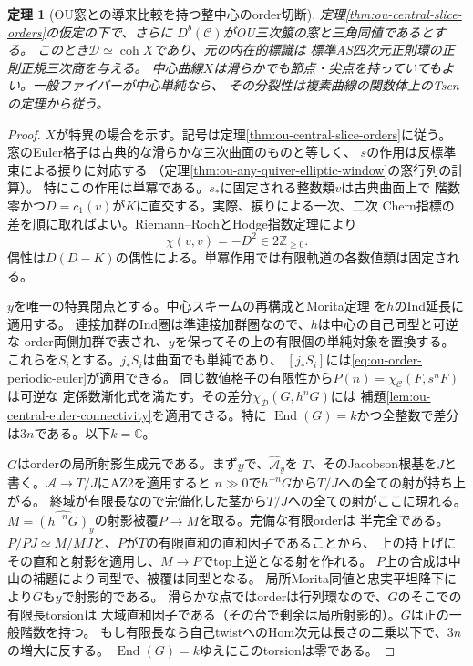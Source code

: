 \documentclass[11pt,a4paper]{ltjsarticle}
\newtheorem{theorem}{定理}[section]
\theoremstyle{definition}
\newcommand{\coh}{\operatorname{coh}}
\begin{document}
\begin{theorem}[OU窓との導来比較を持つ整中心のorder切断]
\label{thm:ou-derived-order-slice}
定理\ref{thm:ou-central-slice-orders}の仮定の下で、さらに
$D^b(\mathcal C)$がOU三次箙の窓と三角同値であるとする。
このとき$\mathcal D\simeq\coh X$であり、元の内在的標識は
標準AS四次元正則環の正則正規三次商を与える。
中心曲線$X$は滑らかでも節点・尖点を持っていてもよい。一般ファイバーが中心単純なら、
その分裂性は複素曲線の関数体上のTsenの定理から従う。
\end{theorem}
\begin{proof}
$X$が特異の場合を示す。記号は定理\ref{thm:ou-central-slice-orders}に従う。
窓のEuler格子は古典的な滑らかな三次曲面のものと等しく、
$s$の作用は反標準束による捩りに対応する
（定理\ref{thm:ou-any-quiver-elliptic-window}の窓行列の計算）。
特にこの作用は単冪である。$s_*$に固定される整数類$v$は古典曲面上で
階数零かつ$D=c_1(v)$が$K$に直交する。実際、捩りによる一次、二次
Chern指標の差を順に取ればよい。Riemann--RochとHodge指数定理により
\[
 \chi(v,v)=-D^2\in 2\mathbb Z_{\ge0}.
 \tag{*}\label{eq:ou-order-periodic-euler}
\]
偶性は$D(D-K)$の偶性による。単冪作用では有限軌道の各数値類は固定される。

$y$を唯一の特異閉点とする。中心スキームの再構成とMorita定理
\cite[Theorems~4.4,~4.6]{BurbanDrozdMorita}を$h$のInd延長に適用する。
連接加群のInd圏は準連接加群圏なので、$h$は中心の自己同型と可逆な
order両側加群で表され、$y$を保ってその上の有限個の単純対象を置換する。
これらを$S_i$とする。$j_*S_i$は曲面でも単純であり、
$[j_*S_i]$には\eqref{eq:ou-order-periodic-euler}が適用できる。
同じ数値格子の有限性から$P(n)=\chi_{\mathcal C}(F,s^nF)$は可逆な
定係数漸化式を満たす。その差分$\chi_{\mathcal D}(G,h^nG)$には
補題\ref{lem:ou-central-euler-connectivity}を適用できる。特に
$\operatorname{End}(G)=k$かつ全整数で差分は$3n$である。以下$k=\mathbb C$。

$G$はorderの局所射影生成元である。まず$y$で、$\widehat{\mathcal A}_y$を
$T$、そのJacobson根基を$J$と書く。$\mathcal A\to T/J$にAZ2を適用すると
$n\gg0$で$h^{-n}G$から$T/J$への全ての射が持ち上がる。
終域が有限長なので完備化した茎から$T/J$への全ての射がここに現れる。
$M=\widehat{(h^{-n}G)}_y$の射影被覆$P\to M$を取る。完備な有限orderは
半完全である。$P/PJ\simeq M/MJ$と、$P$が$T$の有限直和の直和因子であることから、
上の持上げにその直和と射影を適用し、$M\to P$でtop上逆となる射を作れる。
$P$上の合成は中山の補題により同型で、被覆は同型となる。
局所Morita同値と忠実平坦降下により$G$も$y$で射影的である。
滑らかな点ではorderは行列環なので、$G$のそこでの有限長torsionは
大域直和因子である（その台で剰余は局所射影的）。$G$は正の一般階数を持つ。
もし有限長なら自己twistへのHom次元は長さの二乗以下で、$3n$の増大に反する。
$\operatorname{End}(G)=k$ゆえにこのtorsionは零である。


\end{proof}
\end{document}
